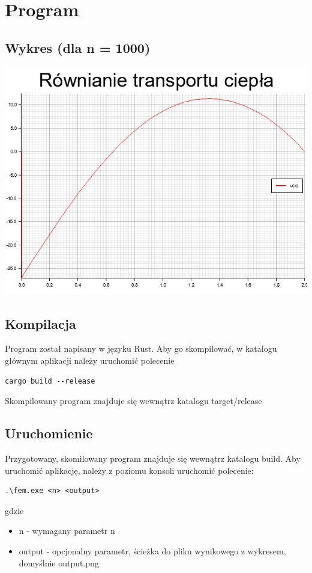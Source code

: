 \documentclass[12pt]{article}
\begin{document}
\section{Program}
\subsection{Wykres (dla n = 1000)}
\includegraphics[width=\textwidth,height=\textheight,keepaspectratio]{plot.png}


\subsection{Kompilacja}
Program został napisany w języku Rust. Aby go skompilować, w katalogu głównym aplikacji należy uruchomić polecenie
\begin{verbatim}
cargo build --release
\end{verbatim}
Skompilowany program znajduje się wewnątrz katalogu target/release

\subsection{Uruchomienie}
Przygotowany, skomilowany program znajduje się wewnątrz katalogu build.
Aby uruchomić aplikację, należy z poziomu konsoli uruchomić polecenie:
\begin{verbatim}
.\fem.exe <n> <output>
\end{verbatim}
gdzie
\begin{itemize}
    \item n - wymagany parametr n
    \item output - opcjonalny parametr, ścieżka do pliku wynikowego z wykresem, domyślnie output.png
\end{itemize}
\end{document}

